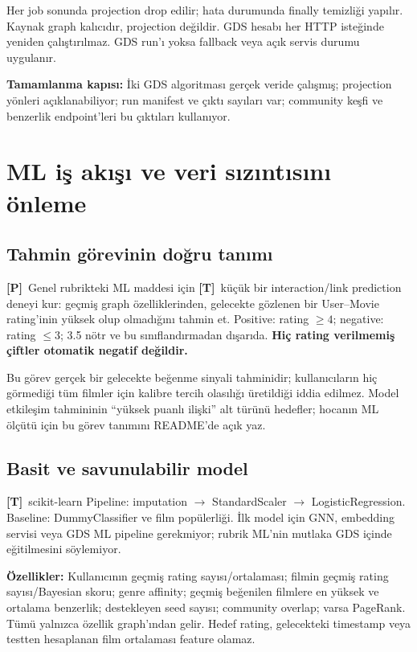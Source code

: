 \documentclass[11pt,a4paper]{article}
\newcommand{\score}{\textbf{[P]}}
\newcommand{\design}{\textbf{[T]}}
\newcommand{\gate}[1]{\par\smallskip\noindent\colorbox{pale}{\parbox{0.96\linewidth}{\textbf{Tamamlanma kapısı:} #1}}\par\smallskip}
\begin{document}
Her job sonunda projection drop edilir; hata durumunda finally temizliği yapılır. Kaynak graph kalıcıdır, projection değildir. GDS hesabı her HTTP isteğinde yeniden çalıştırılmaz. GDS run'ı yoksa fallback veya açık servis durumu uygulanır.

\gate{İki GDS algoritması gerçek veride çalışmış; projection yönleri açıklanabiliyor; run manifest ve çıktı sayıları var; community keşfi ve benzerlik endpoint'leri bu çıktıları kullanıyor.}

\section{ML iş akışı ve veri sızıntısını önleme}
\subsection{Tahmin görevinin doğru tanımı}
\score\ Genel rubrikteki ML maddesi için \design\ küçük bir interaction/link prediction deneyi kur: geçmiş graph özelliklerinden, gelecekte gözlenen bir User--Movie rating'inin yüksek olup olmadığını tahmin et. Positive: rating $\geq4$; negative: rating $\leq3$; 3.5 nötr ve bu sınıflandırmadan dışarıda. \textbf{Hiç rating verilmemiş çiftler otomatik negatif değildir.}

Bu görev gerçek bir gelecekte beğenme sinyali tahminidir; kullanıcıların hiç görmediği tüm filmler için kalibre tercih olasılığı üretildiği iddia edilmez. Model etkileşim tahmininin ``yüksek puanlı ilişki'' alt türünü hedefler; hocanın ML ölçütü için bu görev tanımını README'de açık yaz.

\subsection{Basit ve savunulabilir model}
\design\ scikit-learn Pipeline: imputation $\to$ StandardScaler $\to$ LogisticRegression. Baseline: DummyClassifier ve film popülerliği. İlk model için GNN, embedding servisi veya GDS ML pipeline gerekmiyor; rubrik ML'nin mutlaka GDS içinde eğitilmesini söylemiyor.

\textbf{Özellikler:} Kullanıcının geçmiş rating sayısı/ortalaması; filmin geçmiş rating sayısı/Bayesian skoru; genre affinity; geçmiş beğenilen filmlere en yüksek ve ortalama benzerlik; destekleyen seed sayısı; community overlap; varsa PageRank. Tümü yalnızca özellik graph'ından gelir. Hedef rating, gelecekteki timestamp veya testten hesaplanan film ortalaması feature olamaz.
\end{document}
